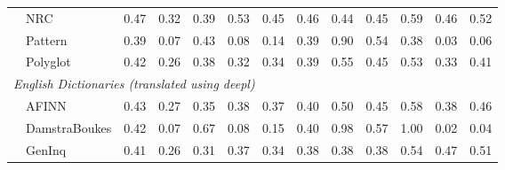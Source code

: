 \begin{tabularx}{\textwidth}{lXXrrrrrrrrrrr}
 & \multicolumn{2}{l}{ NRC }& \cellcolor[gray]{0.76} 0.47& \cellcolor[gray]{0.84} 0.32& \cellcolor[gray]{0.80} 0.39& \cellcolor[gray]{0.73} 0.53& \cellcolor[gray]{0.77} 0.45& \cellcolor[gray]{0.77} 0.46& \cellcolor[gray]{0.78} 0.44& \cellcolor[gray]{0.78} 0.45& \cellcolor[gray]{0.71} 0.59& \cellcolor[gray]{0.77} 0.46& \cellcolor[gray]{0.74} 0.52\\

 & \multicolumn{2}{l}{ Pattern }& \cellcolor[gray]{0.81} 0.39& \cellcolor[gray]{0.97} 0.07& \cellcolor[gray]{0.79} 0.43& \cellcolor[gray]{0.96} 0.08& \cellcolor[gray]{0.93} 0.14& \cellcolor[gray]{0.81} 0.39& \cellcolor[gray]{0.55} 0.90& \cellcolor[gray]{0.73} 0.54& \cellcolor[gray]{0.81} 0.38& \cellcolor[gray]{0.98} 0.03& \cellcolor[gray]{0.97} 0.06\\

 & \multicolumn{2}{l}{ Polyglot }& \cellcolor[gray]{0.79} 0.42& \cellcolor[gray]{0.87} 0.26& \cellcolor[gray]{0.81} 0.38& \cellcolor[gray]{0.84} 0.32& \cellcolor[gray]{0.83} 0.34& \cellcolor[gray]{0.81} 0.39& \cellcolor[gray]{0.72} 0.55& \cellcolor[gray]{0.77} 0.45& \cellcolor[gray]{0.73} 0.53& \cellcolor[gray]{0.83} 0.33& \cellcolor[gray]{0.80} 0.41\\


\multicolumn{11}{l}{\emph{ English Dictionaries (translated using deepl) }} \\

 & \multicolumn{2}{l}{ AFINN }& \cellcolor[gray]{0.79} 0.43& \cellcolor[gray]{0.86} 0.27& \cellcolor[gray]{0.82} 0.35& \cellcolor[gray]{0.81} 0.38& \cellcolor[gray]{0.82} 0.37& \cellcolor[gray]{0.80} 0.40& \cellcolor[gray]{0.75} 0.50& \cellcolor[gray]{0.78} 0.45& \cellcolor[gray]{0.71} 0.58& \cellcolor[gray]{0.81} 0.38& \cellcolor[gray]{0.77} 0.46\\

 & \multicolumn{2}{l}{ DamstraBoukes }& \cellcolor[gray]{0.79} 0.42& \cellcolor[gray]{0.96} 0.07& \cellcolor[gray]{0.67} 0.67& \cellcolor[gray]{0.96} 0.08& \cellcolor[gray]{0.93} 0.15& \cellcolor[gray]{0.80} 0.40& \cellcolor[gray]{0.51} 0.98& \cellcolor[gray]{0.71} 0.57& \cellcolor[gray]{0.50} 1.00& \cellcolor[gray]{0.99} 0.02& \cellcolor[gray]{0.98} 0.04\\

 & \multicolumn{2}{l}{ GenInq }& \cellcolor[gray]{0.80} 0.41& \cellcolor[gray]{0.87} 0.26& \cellcolor[gray]{0.84} 0.31& \cellcolor[gray]{0.82} 0.37& \cellcolor[gray]{0.83} 0.34& \cellcolor[gray]{0.81} 0.38& \cellcolor[gray]{0.81} 0.38& \cellcolor[gray]{0.81} 0.38& \cellcolor[gray]{0.73} 0.54& \cellcolor[gray]{0.76} 0.47& \cellcolor[gray]{0.75} 0.51\\


\end{tabularx}
